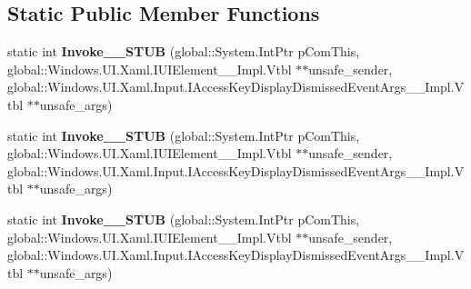 \subsection*{Static Public Member Functions}
\begin{DoxyCompactItemize}
\item 
\mbox{\label{struct_windows_1_1_foundation_1_1_typed_event_handler___a___windows___u_i___xaml___u_i_element__d3bbe6abc1f0f1df72766f3122d9fe94_ad08d7f925d90701e0fb4baeb76f8c309}} 
static int {\bfseries Invoke\+\_\+\+\_\+\+S\+T\+UB} (global\+::\+System.\+Int\+Ptr p\+Com\+This, global\+::\+Windows.\+U\+I.\+Xaml.\+I\+U\+I\+Element\+\_\+\+\_\+\+Impl.\+Vtbl $\ast$$\ast$unsafe\+\_\+sender, global\+::\+Windows.\+U\+I.\+Xaml.\+Input.\+I\+Access\+Key\+Display\+Dismissed\+Event\+Args\+\_\+\+\_\+\+Impl.\+Vtbl $\ast$$\ast$unsafe\+\_\+args)
\item 
\mbox{\label{struct_windows_1_1_foundation_1_1_typed_event_handler___a___windows___u_i___xaml___u_i_element__d3bbe6abc1f0f1df72766f3122d9fe94_ad08d7f925d90701e0fb4baeb76f8c309}} 
static int {\bfseries Invoke\+\_\+\+\_\+\+S\+T\+UB} (global\+::\+System.\+Int\+Ptr p\+Com\+This, global\+::\+Windows.\+U\+I.\+Xaml.\+I\+U\+I\+Element\+\_\+\+\_\+\+Impl.\+Vtbl $\ast$$\ast$unsafe\+\_\+sender, global\+::\+Windows.\+U\+I.\+Xaml.\+Input.\+I\+Access\+Key\+Display\+Dismissed\+Event\+Args\+\_\+\+\_\+\+Impl.\+Vtbl $\ast$$\ast$unsafe\+\_\+args)
\item 
\mbox{\label{struct_windows_1_1_foundation_1_1_typed_event_handler___a___windows___u_i___xaml___u_i_element__d3bbe6abc1f0f1df72766f3122d9fe94_ad08d7f925d90701e0fb4baeb76f8c309}} 
static int {\bfseries Invoke\+\_\+\+\_\+\+S\+T\+UB} (global\+::\+System.\+Int\+Ptr p\+Com\+This, global\+::\+Windows.\+U\+I.\+Xaml.\+I\+U\+I\+Element\+\_\+\+\_\+\+Impl.\+Vtbl $\ast$$\ast$unsafe\+\_\+sender, global\+::\+Windows.\+U\+I.\+Xaml.\+Input.\+I\+Access\+Key\+Display\+Dismissed\+Event\+Args\+\_\+\+\_\+\+Impl.\+Vtbl $\ast$$\ast$unsafe\+\_\+args)
\item 
\mbox{\label{struct_windows_1_1_foundation_1_1_typed_event_handler___a___windows___u_i___xaml___u_i_element__d3bbe6abc1f0f1df72766f3122d9fe94_ad08d7f925d90701e0fb4baeb76f8c309}} 

\end{DoxyCompactItemize}

